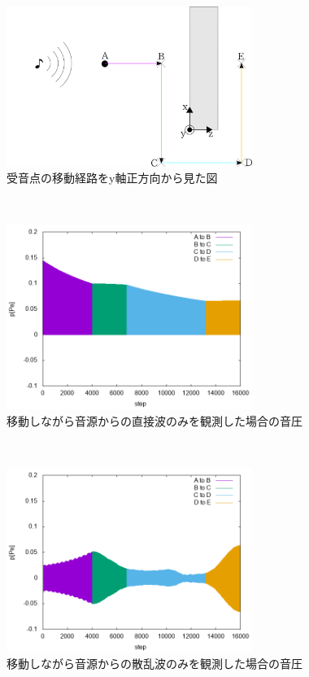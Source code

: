 \documentclass[dvipdfmx]{ampbt}
\begin{document}
\begin{figure}[H]
  \begin{center}
    \includegraphics[clip,width=8.0cm]{./png/route_ue.png}
    \caption{受音点の移動経路をy軸正方向から見た図}
    \label{fig:route_ue}
  \end{center}
\end{figure}\\

\begin{figure}[H]
  \begin{center}
    \includegraphics[clip,width=8.0cm]{./png/kyoukai_chokusetsu.png}
    \caption{移動しながら音源からの直接波のみを観測した場合の音圧}
    \label{fig:kyoukai_chokusetsu}
  \end{center}
\end{figure}\\

\begin{figure}[H]
  \begin{center}
    \includegraphics[clip,width=8.0cm]{./png/kyoukai_hansya.png}
    \caption{移動しながら音源からの散乱波のみを観測した場合の音圧}
    \label{fig:kyoukai_hansya}
  \end{center}
\end{figure}\\
\end{document}
